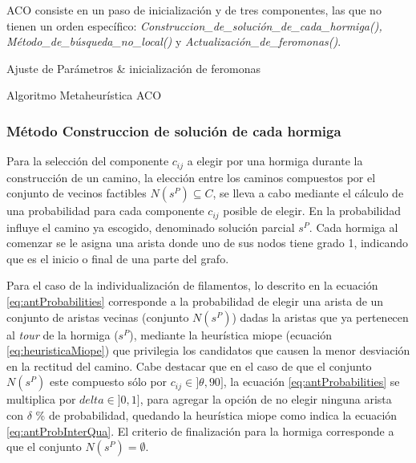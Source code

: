 ACO consiste en un paso de inicializaci\'on y de tres componentes, las que no tienen un orden espec\'ifico: {\it Construccion\_de\_soluci\'on\_de\_cada\_hormiga(),  M\'etodo\_de\_b\'usqueda\_no\_local()} y {\it Actualizaci\'on\_de\_feromonas()}.


\begin{algorithm}[H]
\SetAlgoLined
{}
 Ajuste de Par\'ametros \& inicializaci\'on de feromonas \;
 \caption{Algoritmo Metaheur\'istica ACO}\label{ACO-Algo}
\end{algorithm}


\subsubsection{M\'etodo Construccion de soluci\'on de cada hormiga}
Para la selecci\'on del componente $c_{ij}$ a elegir por una hormiga durante la construcci\'on de un camino, la elecci\'on entre los caminos compuestos por el conjunto de vecinos factibles $N(s^{P}) \subseteq C$, se lleva a cabo mediante el c\'alculo de una probabilidad para cada componente $c_{ij}$ posible de elegir. En la probabilidad influye el camino ya escogido, denominado soluci\'on parcial $s^{P}$. Cada hormiga al comenzar se le asigna una arista donde uno de sus nodos tiene grado 1, indicando que es el inicio o final de una parte del grafo. 

Para el caso de la individualizaci\'on de filamentos, lo descrito en la ecuaci\'on \eqref{eq:antProbabilities} corresponde a la probabilidad de elegir una arista de un conjunto de aristas vecinas (conjunto $N(s^{P})$) dadas la aristas que ya pertenecen al {\it tour} de la hormiga ($s^P$), mediante la heur\'istica miope (ecuaci\'on \eqref{eq:heuristicaMiope}) que privilegia los candidatos que causen la menor desviaci\'on en la rectitud del camino. Cabe destacar que en el caso de que el conjunto $N(s^{P})$ este compuesto s\'olo por $c_{ij} \in ]\theta, 90]$, la ecuaci\'on \eqref{eq:antProbabilities} se multiplica por $delta \in ]0,1]$, para agregar la opci\'on de no elegir ninguna arista con $\delta$ \% de probabilidad, quedando la heur\'istica miope como indica la ecuaci\'on \eqref{eq:antProbInterQua}. El criterio de finalizaci\'on para la hormiga corresponde a que el conjunto $N(s^{P}) = \emptyset$.

